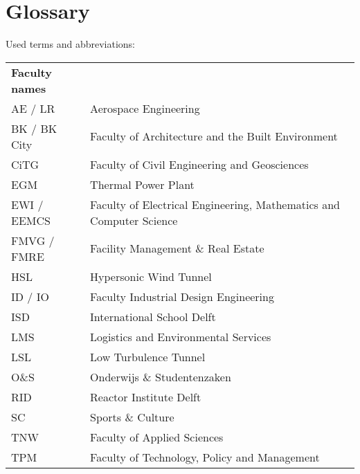 \chapter{Glossary}
Used terms and abbreviations:
\begin{table}[H]
\label{my-label}
\begin{tabular}{ll}
\textbf{Faculty names} &                                                                     \\
AE / LR                & Aerospace Engineering                                               \\
BK / BK City           & Faculty of Architecture and the Built Environment                   \\
CiTG                   & Faculty of Civil Engineering and Geosciences                        \\
EGM                    & Thermal Power Plant                                                 \\
EWI / EEMCS            & Faculty of Electrical Engineering, Mathematics and Computer Science \\
FMVG / FMRE            & Facility Management \& Real Estate                                  \\
HSL                    & Hypersonic Wind Tunnel                                              \\
ID / IO                & Faculty Industrial Design Engineering                               \\
ISD                    & International School Delft                                          \\
LMS                    & Logistics and Environmental Services                                \\
LSL                    & Low Turbulence Tunnel                                               \\
O\&S                   & Onderwijs \& Studentenzaken                                         \\
RID                    & Reactor Institute Delft                                             \\
SC                     & Sports \& Culture                                                   \\
TNW                    & Faculty of Applied Sciences                                         \\
TPM                    & Faculty of Technology, Policy and Management                        \\
\end{tabular}
\end{table}

